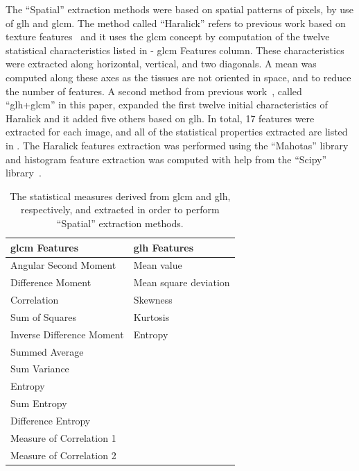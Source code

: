\documentclass[journal,article,accept,moreauthors,pdftex, applsci]{Definitions/mdpi}
\begin{document}
The “Spatial” extraction methods were based on spatial patterns of pixels, by use of \ac{glh} and \ac{glcm}. The method called “Haralick” refers to previous work based on texture features~\cite{Haralick1973} and it uses the \ac{glcm} concept by computation of the twelve statistical characteristics listed in  - \ac{glcm} Features column. These characteristics were extracted along horizontal, vertical, and two diagonals. A mean was computed along these axes as the tissues are not oriented in space, and to reduce the number of features. A second method from previous work~\cite{Wiltgen2008}, called “\ac{glh}+\ac{glcm}” in this paper, expanded the first twelve initial characteristics of Haralick and it added five others based on \ac{glh}. In total, 17 features were extracted for each image, and all of the statistical properties extracted are listed in . The Haralick features extraction was performed using the “Mahotas” library~\cite{coelho2012mahotas} and histogram feature extraction was computed with help from the “Scipy” library~\cite{Jones2001}.\par
\begin{table}[H]
    \centering
    \begin{tabular}{ll}
        \hline
        \textbf{\ac{glcm} Features}& \textbf{\ac{glh} Features}     \\ \hline
        Angular Second Moment      & Mean value                     \\
        Difference Moment          & Mean square deviation          \\
        Correlation                & Skewness                       \\
        Sum of Squares             & Kurtosis                       \\
        Inverse Difference Moment  & Entropy                        \\     
        Summed Average             &                                \\    
        Sum Variance               &                                \\    
        Entropy                    &                                \\    
        Sum Entropy                &                                \\    
        Difference Entropy         &                                \\    
        Measure of Correlation 1   &                                \\  
        Measure of Correlation 2   &                                \\ 
    \end{tabular}
    \caption{The statistical measures derived from \ac{glcm} and \ac{glh}, respectively, and extracted in order to perform “Spatial” extraction methods.}
    \label{tab:histogram_features}
\end{table}\par
\end{document}
